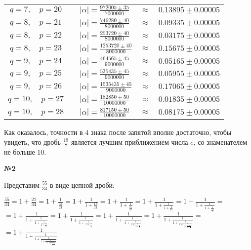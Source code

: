 \documentclass{article}
\newenvironment{task}{\begin{center}\fontsize{14}{14}\selectfont\bf}{\rm\fontsize{12}{12}\selectfont\end{center}}
\begin{document}
\begin{center}
\begin{tabular}{clcl}
			$q = 7, \quad p = 20 \quad 	 $ & $ 
			|\alpha| = \frac{972005 \pm 35}{7000000}$ & $ \approx $ & $ 0.13895 \pm 0.00005 $\\
			$q = 8, \quad p = 21 \quad 	 $ & $ 
			|\alpha| = \frac{746280 \pm 40}{8000000}$ & $ \approx $ & $ 0.09335 \pm 0.00005 $\\
			$q = 8, \quad p = 22 \quad 	 $ & $ 
			|\alpha| = \frac{253720 \pm 40}{8000000}$ & $ \approx $ & $ 0.03175 \pm 0.00005 $\\
			$q = 8, \quad p = 23 \quad 	 $ & $ 
			|\alpha| = \frac{1253720 \pm 40}{8000000}$ & $ \approx $ & $ 0.15675 \pm 0.00005 $\\
			$q = 9, \quad p = 24 \quad 	 $ & $ 
			|\alpha| = \frac{464565 \pm 45}{9000000}$ & $ \approx $ & $ 0.05165 \pm 0.00005 $\\
			$q = 9, \quad p = 25 \quad 	 $ & $ 
			|\alpha| = \frac{535435 \pm 45}{9000000}$ & $ \approx $ & $ 0.05955 \pm 0.00005 $\\
			$q = 9, \quad p = 26 \quad 	 $ & $ 
			|\alpha| = \frac{1535435 \pm 45}{9000000}$ & $ \approx $ & $ 0.17065 \pm 0.00005 $\\
			$q = 10, \quad p = 27 \quad 	 $ & $ 
			|\alpha| = \frac{182850 \pm 50}{10000000}$ & $ \approx $ & $ 0.01835 \pm 0.00005 $\\
			$q = 10, \quad p = 28 \quad 	 $ & $ 
			|\alpha| = \frac{817150 \pm 50}{10000000}$ & $ \approx $ & $ 0.08175 \pm 0.00005 $\\
			
		\end{tabular}
	\end{center}
	Как оказалось, точности в 4 знака после запятой вполне достаточно, чтобы увидеть, что дробь $\frac{19}{7}$ является лучшим приближением числа $e$, со знаменателем не больше 10.
	
	\begin{task} 
		№2
	\end{task}
	Представим $\frac{55}{34}$ в виде цепной дроби: 
	\begin{center}
		\fontsize{14}{14}\selectfont
		$\frac{55}{34} = 1 + \frac{21}{34} = 1 +  \frac{1}{\frac{34}{21}} = 1 +  \frac{1}{1 + \frac{13}{21}} = 
		1 +  \frac{1}{1 + \frac{1}{\frac{21}{13}}}  = 1 +  \frac{1}{1 + \frac{1}{1 + \frac{8}{13}}} 
		= 1 +  \frac{1}{1 + \frac{1}{1 + \frac{1}{\frac{13}{8}}}} =$ \\
		$= 1 +  \frac{1}{1 + \frac{1}{1 + \frac{1}{1 + \frac{5}{8}}}} 
		= 1 +  \frac{1}{1 + \frac{1}{1 + \frac{1}{1 + \frac{1}{\frac{8}{5}}}}} 
		= 1 +  \frac{1}{1 + \frac{1}{1 + \frac{1}{1 + \frac{1}{1 + \frac{3}{5}}}}} 
		= 1 +  \frac{1}{1 + \frac{1}{1 + \frac{1}{1 + \frac{1}{1 + \frac{1}{1 + \frac{2}{3}}}}}} = $\\
		\fontsize{16}{16}\selectfont
		$= 1 +  \frac{1}{1 + \frac{1}{1 + \frac{1}{1 + \frac{1}{1 + \frac{1}{1 + \frac{1}{1 + \frac{1}{2}}}}}}} $
		\fontsize{12}{12}\selectfont
	\end{center}
\end{document}
